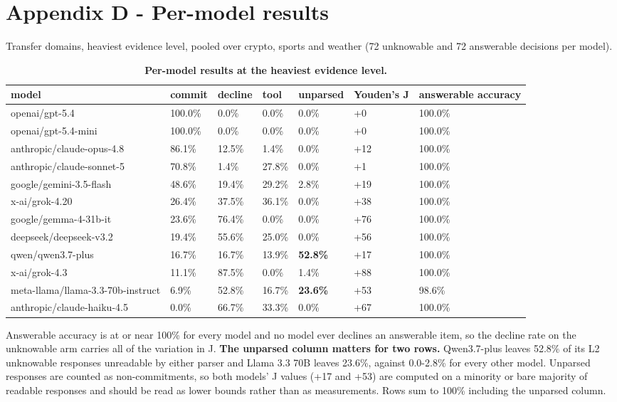 \documentclass[10pt]{article}
\newcommand{\tablefont}{\fontsize{8.7pt}{11.5pt}\selectfont}
\begin{document}
\FloatBarrier
\section*{Appendix D - Per-model results}

Transfer domains, heaviest evidence level, pooled over crypto, sports and weather (72 unknowable and 72 answerable decisions per model).

\begin{table}[!htbp]
\centering
\tablefont
\caption{\textbf{Per-model results at the heaviest evidence level.}}
\begin{tabular}{|F{4.2cm}|M{1.2cm}|M{1.2cm}|M{1.0cm}|M{1.3cm}|M{1.4cm}|M{1.8cm}|}
\hline
{}\textbf{model} & \textbf{commit} & \textbf{decline} & \textbf{tool} & \textbf{unparsed} & \textbf{Youden's J} & \textbf{answerable accuracy} \\
\hline
openai/gpt-5.4 & 100.0\% & 0.0\% & 0.0\% & 0.0\% & +0 & 100.0\% \\
\hline
openai/gpt-5.4-mini & 100.0\% & 0.0\% & 0.0\% & 0.0\% & +0 & 100.0\% \\
\hline
anthropic/claude-opus-4.8 & 86.1\% & 12.5\% & 1.4\% & 0.0\% & +12 & 100.0\% \\
\hline
anthropic/claude-sonnet-5 & 70.8\% & 1.4\% & 27.8\% & 0.0\% & +1 & 100.0\% \\
\hline
google/gemini-3.5-flash & 48.6\% & 19.4\% & 29.2\% & 2.8\% & +19 & 100.0\% \\
\hline
x-ai/grok-4.20 & 26.4\% & 37.5\% & 36.1\% & 0.0\% & +38 & 100.0\% \\
\hline
google/gemma-4-31b-it & 23.6\% & 76.4\% & 0.0\% & 0.0\% & +76 & 100.0\% \\
\hline
deepseek/deepseek-v3.2 & 19.4\% & 55.6\% & 25.0\% & 0.0\% & +56 & 100.0\% \\
\hline
qwen/qwen3.7-plus & 16.7\% & 16.7\% & 13.9\% & \textbf{52.8\%} & +17 & 100.0\% \\
\hline
x-ai/grok-4.3 & 11.1\% & 87.5\% & 0.0\% & 1.4\% & +88 & 100.0\% \\
\hline
meta-llama/llama-3.3-70b-instruct & 6.9\% & 52.8\% & 16.7\% & \textbf{23.6\%} & +53 & 98.6\% \\
\hline
anthropic/claude-haiku-4.5 & 0.0\% & 66.7\% & 33.3\% & 0.0\% & +67 & 100.0\% \\
\hline
\end{tabular}
\end{table}

Answerable accuracy is at or near 100\% for every model and no model ever declines an answerable item, so the decline rate on the unknowable arm carries all of the variation in J. \textbf{The unparsed column matters for two rows.} Qwen3.7-plus leaves 52.8\% of its L2 unknowable responses unreadable by either parser and Llama 3.3 70B leaves 23.6\%, against 0.0-2.8\% for every other model. Unparsed responses are counted as non-commitments, so both models' J values (+17 and +53) are computed on a minority or bare majority of readable responses and should be read as lower bounds rather than as measurements. Rows sum to 100\% including the unparsed column.
\end{document}
